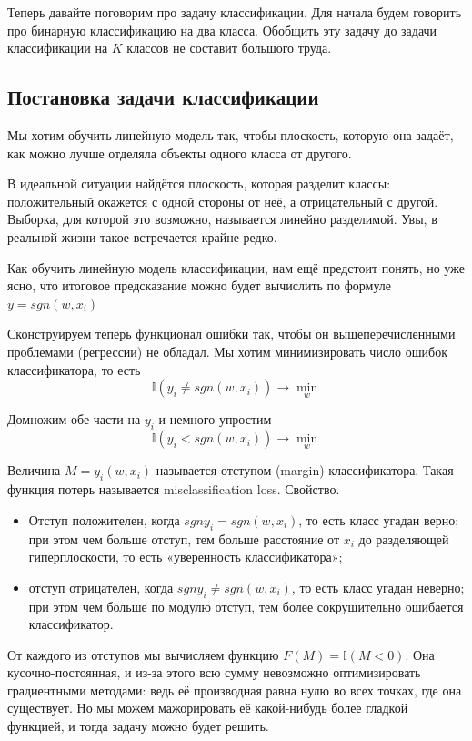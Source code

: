 Теперь давайте поговорим про задачу классификации.
Для начала будем говорить про бинарную классификацию на два класса.
Обобщить эту задачу до задачи классификации на $K$ классов не составит большого труда.

\subsection{Постановка задачи классификации}

Мы хотим обучить линейную модель так, чтобы плоскость, которую она задаёт, как можно лучше отделяла объекты
одного класса от другого.

В идеальной ситуации найдётся плоскость, которая разделит классы: положительный окажется с одной стороны от неё, а
отрицательный с другой.
Выборка, для которой это возможно, называется линейно разделимой.
Увы, в реальной жизни такое встречается крайне редко.

Как обучить линейную модель классификации, нам ещё предстоит понять, но уже ясно, что итоговое предсказание можно
будет вычислить по формуле $y = sgn (w,x_i)$

Сконструируем теперь функционал ошибки так, чтобы он вышеперечисленными проблемами (регрессии) не обладал.
Мы хотим минимизировать число ошибок классификатора, то есть
\[ \mathbb{I} (y_i \neq sgn (w,x_i) ) \rightarrow \min_w \]

Домножим обе части на $y_i$ и немного упростим
\[ \mathbb{I} (y_i < sgn (w,x_i) ) \rightarrow \min_w \]

Величина $M = y_i (w, x_i)$ называется отступом (margin) классификатора.
Такая функция потерь называется misclassification loss.
Свойство.

\begin{itemize}
    \item Отступ положителен, когда $sgn y_i = sgn (w,x_i)$, то есть класс угадан верно; при этом чем больше
    отступ, тем больше расстояние от $x_i$ до разделяющей гиперплоскости, то есть «уверенность классификатора»;
    \item отступ отрицателен, когда $sgn y_i \neq sgn (w,x_i)$, то есть класс угадан неверно; при этом чем больше
    по модулю отступ, тем более сокрушительно ошибается классификатор.
\end{itemize}

От каждого из отступов мы вычисляем функцию $F(M) = \mathbb{I} (M < 0)$.
Она кусочно-постоянная, и из-за этого всю сумму невозможно оптимизировать градиентными методами: ведь её производная
равна нулю во всех точках, где она существует.
Но мы можем мажорировать её какой-нибудь более гладкой функцией, и тогда задачу можно будет решить.

